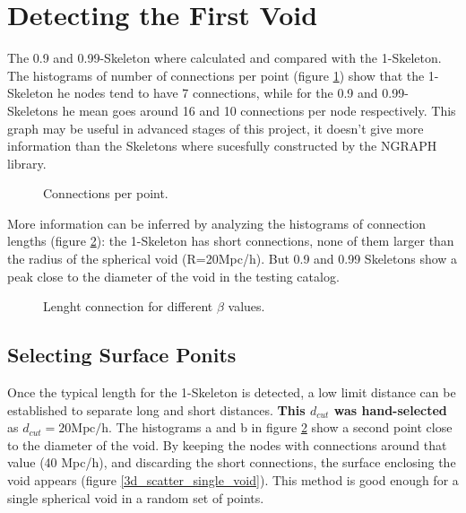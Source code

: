 \documentclass[preprint]{aastex62}
\begin{document}
\section{Detecting the First Void}

The 0.9 and 0.99-Skeleton where calculated and compared
with the 1-Skeleton. The histograms of number of connections per
point (figure \ref{Fig_Connections_per_point}) show that the
1-Skeleton he nodes tend to have 7 connections, while for the 0.9
and 0.99-Skeletons he mean goes around 16 and 10 connections per
node respectively. This graph may be useful in advanced stages of
this project, it doesn't give more information than the Skeletons
where sucesfully constructed by the NGRAPH library.

\begin{figure}
  \caption{Connections per point. \label{Fig_Connections_per_point}}
\end{figure}

More information can be inferred by analyzing the histograms of
connection lengths (figure \ref{Fig_Length_connection}):
the 1-Skeleton has short connections, none of
them larger than the radius of the spherical void (R=20Mpc/h). But
0.9 and 0.99 Skeletons show a peak close to the diameter of the
void in the testing catalog.

\begin{figure}
  \caption{Lenght connection for different $\beta$ values.
    \label{Fig_Length_connection}}
\end{figure}

\subsection{Selecting Surface Ponits}

Once the typical length for the 1-Skeleton is detected, a low limit
distance can be established to separate long and short distances.
\textbf{This $d_{cut}$ was hand-selected} as $d_{cut}=20 \mathrm{Mpc/h}$.
The histograms a and b in figure \ref{Fig_Length_connection} show a
second point close to the diameter of the void. By keeping the nodes with
connections around that value (40 Mpc/h), and discarding the short
connections, the surface enclosing the void appears
(figure \ref{3d_scatter_single_void}). This method is good enough
for a single spherical void in a random set of points.
\end{document}
